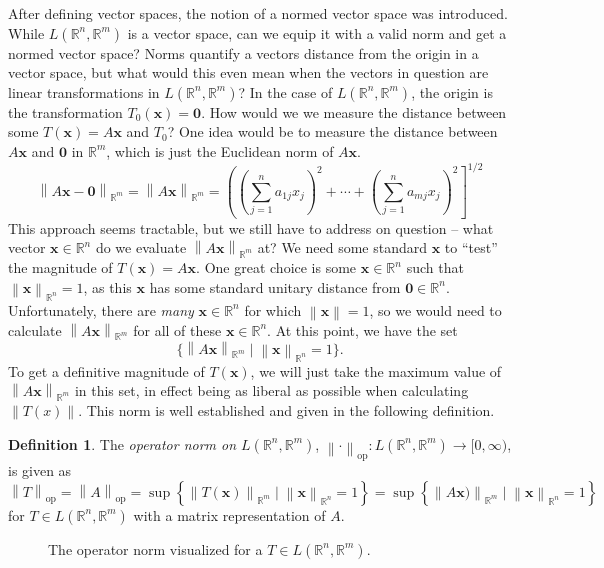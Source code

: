 \documentclass{article}
\newcommand{\R}{\mathbb{R}}
\newcommand{\x}{\mathbf{x}}
\newcommand{\ze}{\mathbf{0}}
\newcommand{\norm}[1]{\left\lVert#1\right\rVert}
\theoremstyle{definition}
\newtheorem{definition}{Definition}[section]
\begin{document}
	After defining vector spaces, the notion of a normed vector space was introduced. While $ L(\R^n,\R^m) $ is a vector space, can we equip it with a valid norm and get a normed vector space? Norms quantify a vectors distance from the origin in a vector space, but what would this even mean when the vectors in question are linear transformations in $ L(\R^n, \R^m) $? In the case of $ L(\R^n,\R^m) $, the origin is the transformation $ T_0(\x)=\ze $. How would we we measure the distance between some $ T(\x)=A\x $ and $ T_0 $? One idea would be to measure the distance between $ A\x $ and $ \ze $ in $ \R^m $, which is just the Euclidean norm of $ A\x $.
	$$ \norm{A\x - \ze }_{\R^m}= \norm{A\x}_{\R^m} = \left(\left(\sum_{j=1}^{n}a_{1j}x_j\right)^2 + \cdots + \left(\sum_{j=1}^{n}a_{mj}x_j \right)^2\right]^{1/2}$$
	This approach seems tractable, but we still have to address on question -- what vector $ \x\in\R^n $ do we evaluate $ \norm{A\x}_{\R^m} $ at? We need some standard $ \x $ to ``test'' the magnitude of $ T(\x)=A\x $. One great choice is some $ \x\in\R^n $ such that $ \norm{\x}_{\R^n} = 1 $, as this $ \x $ has some standard unitary distance from $ \ze \in \R^n $. Unfortunately, there are \textit{many} $ \x\in\R^n $ for which $ \norm{\x}=1 $, so we would need to calculate $ \norm{A\x}_{\R^m} $ for all of these $ \x\in\R^n $. At this point, we have the set $$ \{\norm{A\x}_{\R^m}\mid \norm{\x}_{\R^n} = 1\} .$$ To get a definitive magnitude of $ T(\x) $, we will just take the maximum value of $ \norm{A\x}_{\R^m} $ in this set, in effect being as liberal as possible when calculating $ \norm{T(x)} $. This norm is well established and given in the following definition.  
	\begin{definition}\label{def}
		The \textit{\color{red}operator norm on $ L(\R^n,\R^m) $}, $ \norm{\cdot}_\text{op}:L(\R^n,\R^m)\to [0,\infty) $, is given as 
		$$ \norm{T}_\text{op} = \norm{A}_\text{op}= \sup\left\{\norm{T(\x)}_{\R^m}\mid \norm{\x}_{\R^n} = 1\right\} = \sup\left\{\norm{A\x)}_{\R^m}\mid \norm{\x}_{\R^n} = 1\right\}$$
		for $ T\in L(\R^n,\R^m) $ with a matrix representation of $ A $. 
	\end{definition}
	\begin{figure}[h!]
		\centering
		\caption{The operator norm visualized for a $ T\in L(\R^n,\R^m) $.}
	\end{figure}
	
\end{document}
